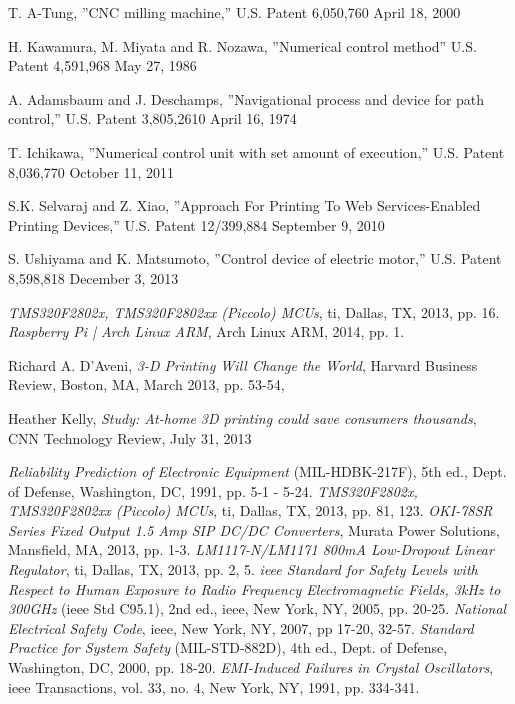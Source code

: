 \begin{thebibliography}{9}

T. A-Tung, 
”CNC milling machine,” 
U.S. Patent 6,050,760 April 18, 2000

H. Kawamura, M. Miyata and R. Nozawa, 
”Numerical control method” 
U.S. Patent 4,591,968 May 27, 1986

A. Adamsbaum and J. Deschamps, 
”Navigational process and device for path control,” 
U.S. Patent 3,805,2610 April 16, 1974

 T. Ichikawa, 
”Numerical control unit with set amount of execution,” 
U.S. Patent 8,036,770 October 11, 2011

S.K. Selvaraj and Z. Xiao, 
”Approach For Printing To Web Services-Enabled Printing Devices,” 
U.S. Patent 12/399,884 September 9, 2010

S. Ushiyama and K. Matsumoto,  
”Control device of electric motor,” 
U.S. Patent 8,598,818 December 3, 2013

	\textit{TMS320F2802x, TMS320F2802xx (Piccolo) MCUs},
	\gls{ti}, Dallas, TX,
	2013, pp. 16.
	\textit{Raspberry Pi | Arch Linux ARM},
	Arch Linux ARM,
	2014, pp. 1.

	Richard A. D'Aveni,
	\textit{3-D Printing Will Change the World},
	Harvard Business Review, Boston, MA,
	March 2013, pp. 53-54,

	Heather Kelly,
	\textit{Study: At-home 3D printing could save consumers thousands},
	CNN Technology Review,
	July 31, 2013

	\textit{Reliability Prediction of Electronic Equipment} (MIL-HDBK-217F), 5th ed.,
	Dept. of Defense, Washington, DC,
	1991, pp. 5-1 - 5-24.
	\textit{TMS320F2802x, TMS320F2802xx (Piccolo) MCUs},
	\gls{ti}, Dallas, TX,
	2013, pp. 81, 123.
	\textit{OKI-78SR Series Fixed Output 1.5 Amp SIP DC/DC Converters},
	Murata Power Solutions, Mansfield, MA,
	2013, pp. 1-3.
	\textit{LM1117-N/LM1171 800mA Low-Dropout Linear Regulator},
	\gls{ti}, Dallas, TX,
	2013, pp. 2, 5.
	\textit{\gls{ieee} Standard for Safety Levels with Respect to Human Exposure to Radio Frequency Electromagnetic Fields, 3kHz to 300GHz} (\gls{ieee} Std C95.1), 2nd ed.,
	\gls{ieee}, New York, NY,
	2005, pp. 20-25.
	\textit{National Electrical Safety Code},
	\gls{ieee}, New York, NY,
	2007, pp 17-20, 32-57.
	\textit{Standard Practice for System Safety} (MIL-STD-882D), 4th ed.,
	Dept. of Defense, Washington, DC,
	2000, pp. 18-20.
	\textit{EMI-Induced Failures in Crystal Oscillators},
	\gls{ieee} Transactions, vol. 33, no. 4, New York, NY,
	1991, pp. 334-341.


\end{thebibliography}
